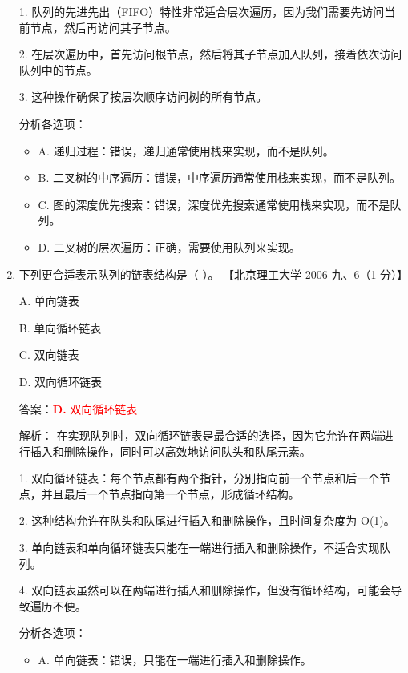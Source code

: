 \documentclass[lang=cn,newtx,10pt,scheme=chinese]{../../../elegantbook}
\begin{document}
\begin{enumerate}
    1. 队列的先进先出（FIFO）特性非常适合层次遍历，因为我们需要先访问当前节点，然后再访问其子节点。

    2. 在层次遍历中，首先访问根节点，然后将其子节点加入队列，接着依次访问队列中的节点。

    3. 这种操作确保了按层次顺序访问树的所有节点。

    分析各选项：

    \begin{itemize}
        \item A. 递归过程：错误，递归通常使用栈来实现，而不是队列。
        
        \item B. 二叉树的中序遍历：错误，中序遍历通常使用栈来实现，而不是队列。
        
        \item C. 图的深度优先搜索：错误，深度优先搜索通常使用栈来实现，而不是队列。
        
        \item D. 二叉树的层次遍历：正确，需要使用队列来实现。
    \end{itemize}

    \item 下列更合适表示队列的链表结构是（ ）。  
    【北京理工大学 2006 九、6（1 分）】  

    A. 单向链表  

    B. 单向循环链表  

    C. 双向链表  

    D. 双向循环链表  

    答案：\textcolor{red}{\textbf{D.} 双向循环链表}

    解析：
    在实现队列时，双向循环链表是最合适的选择，因为它允许在两端进行插入和删除操作，同时可以高效地访问队头和队尾元素。

    1. 双向循环链表：每个节点都有两个指针，分别指向前一个节点和后一个节点，并且最后一个节点指向第一个节点，形成循环结构。

    2. 这种结构允许在队头和队尾进行插入和删除操作，且时间复杂度为 O(1)。

    3. 单向链表和单向循环链表只能在一端进行插入和删除操作，不适合实现队列。

    4. 双向链表虽然可以在两端进行插入和删除操作，但没有循环结构，可能会导致遍历不便。

    分析各选项：
    \begin{itemize}
        \item A. 单向链表：错误，只能在一端进行插入和删除操作。
        

\end{itemize}
\end{enumerate}
\end{document}
